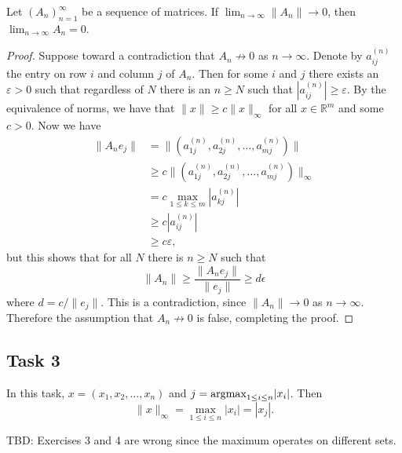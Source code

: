 \documentclass[a4paper,12pt]{article}
\begin{document}
\begin{proposition}
  Let \((A_n)_{n=1}^\infty\) be a sequence of matrices.
  If \(\lim_{n \to \infty} \|A_n\| \to 0\), then
  \(\lim_{n \to \infty} A_n = 0\).
\end{proposition}
\begin{proof}
  Suppose toward a contradiction that \(A_n \not \to 0\) as \(n \to \infty\).
  Denote by \(a_{ij}^{(n)}\) the entry on row \(i\) and column \(j\) of \(A_n\).
  Then for some \(i\) and \(j\) there exists an \(\varepsilon > 0\) such that
  regardless of \(N\) there is an \(n \ge N\) such that
  \(|a_{ij}^{(n)}| \ge \varepsilon\).
  By the equivalence of norms, we have that \(\|x\| \ge c\|x\|_\infty\) for all
  \(x \in \mathbb{R}^m\) and some \(c > 0\).
  Now we have
  \begin{align*}
    \|A_n e_j\|
      &= \|(a^{(n)}_{1j}, a^{(n)}_{2j}, \dots, a^{(n)}_{mj})\| \\
      &\ge c\|(a^{(n)}_{1j}, a^{(n)}_{2j}, \dots, a^{(n)}_{mj})\|_\infty \\
      &= c \max_{1 \le k \le m} |a_{kj}^{(n)}| \\
      &\ge c |a^{(n)}_{ij}| \\
      &\ge c \varepsilon,
  \end{align*}
  but this shows that for all \(N\) there is \(n \ge N\) such that
  \[
    \|A_n\|
      \ge \frac{\|A_n e_j\|}{\|e_j\|}
      \ge d\epsilon
  \]
  where \(d = c/\|e_j\|\).
  This is a contradiction, since \(\|A_n\| \to 0\) as \(n \to \infty\).
  Therefore the assumption that \(A_n \not \to 0\) is false, completing the
  proof.
\end{proof}


\subsection*{Task 3}

In this task, \(x = (x_1,x_2,\dots,x_n)\) and
\(j = \mathrm{argmax}_{1 \le i \le n} |x_i|\).
Then
\[ \|x\|_\infty = \max_{1 \le i \le n} |x_i| = |x_j|. \]

TBD: Exercises 3 and 4 are wrong since the maximum operates on different
sets.
\end{document}
